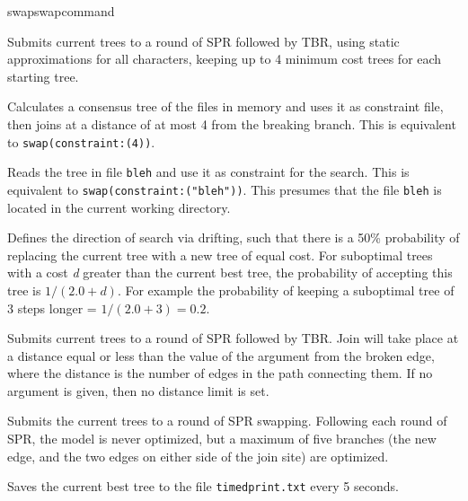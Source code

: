 \begin{command}{swap}{swapcommand}
\begin{poyexamples}
{Submits current trees to a round of SPR followed by TBR, using
static approximations for all characters, keeping up to 4 minimum
cost trees for each starting tree.}

{Calculates a consensus tree of the files in memory and uses it as
constraint file, then joins at a distance of at most 4 from the breaking
branch. This is equivalent to \texttt{swap(constraint:(4))}.}

{Reads the tree in file \texttt{bleh} and use it as constraint for the
search. This is equivalent to \texttt{swap(constraint:("bleh"))}. This 
presumes that the file \texttt{bleh} is located in the current working directory.}	

{Defines the direction of search via drifting, such that there is a 50\% probability of 
replacing the current tree with a new tree of equal cost. For suboptimal trees with 
a cost \emph{d} greater than the current best tree, the probability of accepting this tree 
is $1 / (2.0 + d)$. For example the
probability of keeping a suboptimal tree of 3 steps longer = $1 / (2.0 + 3) = 0.2$.}

{Submits current trees to a round of SPR followed by TBR. Join will take place
at a distance equal or less than the value of the argument from the broken edge, 
where the distance is the number of edges in the path connecting them. If no 
argument is given, then no distance limit is set.}

{Submits the current trees to a round of SPR swapping. Following each round of SPR,
the model is never optimized, but a maximum of five branches (the new edge, and the two
edges on either side of the join site) are optimized.}

{Saves the current best tree to the file \texttt{timedprint.txt} every 5 seconds.}

\end{poyexamples}

\begin{poyalso}
\end{poyalso} 

\end{command}


